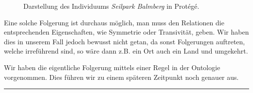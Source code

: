 \begin{figure}[H]
\centering {}
\caption{Darstellung des Individuums \textit{Seilpark Balmberg} in Protégé.\label{fig:inferenz_protege}\protect\footnotemark}
\end{figure}

Eine solche Folgerung ist durchaus möglich, man muss den Relationen die entsprechenden Eigenschaften, wie Symmetrie oder Transivität, geben. Wir haben dies in unserem Fall jedoch bewusst nicht getan, da sonst Folgerungen auftreten, welche irreführend sind, so wäre dann z.B. ein Ort auch ein Land und umgekehrt.

Wir haben die eigentliche Folgerung mittels einer Regel in der Ontologie vorgenommen. Dies führen wir zu einem späteren Zeitpunkt noch genauer aus.

\noindent\rule[1ex]{\textwidth}{1pt}
